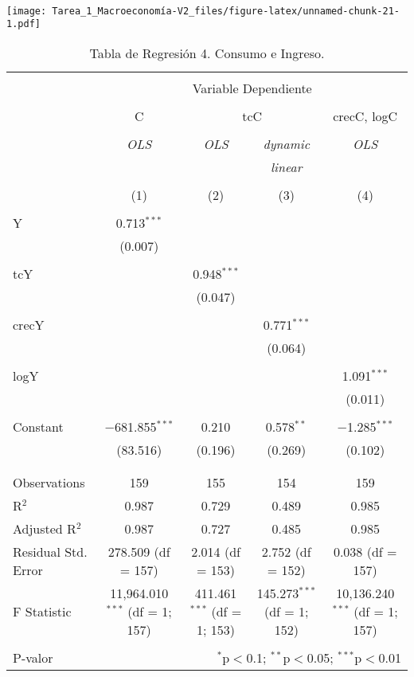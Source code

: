 \documentclass[
]{article}
\begin{document}
~

\texttt{[image: Tarea\_1\_Macroeconomía-V2\_files/figure-latex/unnamed-chunk-21-1.pdf]}

\begin{table}[!htbp] \centering 
  \caption{Tabla de Regresión 4. Consumo e Ingreso.} 
  \label{} 
\scriptsize 
\begin{tabular}{@{\extracolsep{5pt}}lcccc} 
\\[-1.8ex]\hline 
\hline \\[-1.8ex] 
 & \multicolumn{4}{c}{Variable Dependiente} \\ 
\cline{2-5} 
\\[-1.8ex] & C & \multicolumn{2}{c}{tcC} & crecC, logC \\ 
\\[-1.8ex] & \textit{OLS} & \textit{OLS} & \textit{dynamic} & \textit{OLS} \\ 
 & \textit{} & \textit{} & \textit{linear} & \textit{} \\ 
\\[-1.8ex] & (1) & (2) & (3) & (4)\\ 
\hline \\[-1.8ex] 
 Y & 0.713$^{***}$ &  &  &  \\ 
  & (0.007) &  &  &  \\ 
  & & & & \\ 
 tcY &  & 0.948$^{***}$ &  &  \\ 
  &  & (0.047) &  &  \\ 
  & & & & \\ 
 crecY &  &  & 0.771$^{***}$ &  \\ 
  &  &  & (0.064) &  \\ 
  & & & & \\ 
 logY &  &  &  & 1.091$^{***}$ \\ 
  &  &  &  & (0.011) \\ 
  & & & & \\ 
 Constant & $-$681.855$^{***}$ & 0.210 & 0.578$^{**}$ & $-$1.285$^{***}$ \\ 
  & (83.516) & (0.196) & (0.269) & (0.102) \\ 
  & & & & \\ 
\hline \\[-1.8ex] 
Observations & 159 & 155 & 154 & 159 \\ 
R$^{2}$ & 0.987 & 0.729 & 0.489 & 0.985 \\ 
Adjusted R$^{2}$ & 0.987 & 0.727 & 0.485 & 0.985 \\ 
Residual Std. Error & 278.509 (df = 157) & 2.014 (df = 153) & 2.752 (df = 152) & 0.038 (df = 157) \\ 
F Statistic & 11,964.010$^{***}$ (df = 1; 157) & 411.461$^{***}$ (df = 1; 153) & 145.273$^{***}$ (df = 1; 152) & 10,136.240$^{***}$ (df = 1; 157) \\ 
\hline 
\hline \\[-1.8ex] 
P-valor & \multicolumn{4}{r}{$^{*}$p$<$0.1; $^{**}$p$<$0.05; $^{***}$p$<$0.01} \\ 
\end{tabular} 
\end{table}
\end{document}
